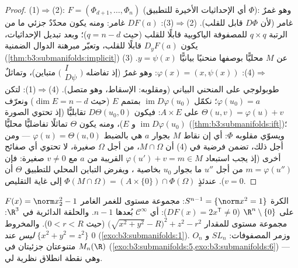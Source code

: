 \begin{proof}
(1)$\Rightarrow$(2): $F = (\Phi_{d+1}, \dots, \Phi_n)$ (أي الإحداثيات الأخيرة للتطبيق
$\Phi$): وهو غمرٌ غامر (لأن $D\Phi$ قابل للقلب).
(2)$\Rightarrow$(3): $DF(a)$ غامر: ومنه يكون محدّدٌ جزئي ما من
الرتبة $q \times q$ للمصفوفة الياكوبية قابلًا للقلب (حيث
$q = n - d$)؛ وبعد تبديل الإحداثيات، يكون $D_yF(a)$ قابلًا
للقلب، وتعبّر مبرهنة الدوال الضمنية (\cref{thm:b3:submanifolds:implicit}) عن $M$
محليًّا بوصفها منحنيًا بيانيًّا $y = \psi(x)$.
(3)$\Rightarrow$(4): $\varphi(x) = (x, \psi(x))$: وهو غمرٌ (إذ تفاضله $\bigl(\begin{smallmatrix}I\\
D\psi\end{smallmatrix}\bigr)$ متباين)،
وتماثلٌ طوبولوجي على المنحني البياني (ومقلوبه: الإسقاط، وهو
متصل).
(4)$\Rightarrow$(1): لتكن $\varphi(u_0) = a$؛ نكمّل $\operatorname{im}D\varphi(u_0)$ بمتمم $E$ (حيث
$\dim E = n - d$) ونعرّف $\Theta(u, v) = \varphi(u) + v$ على $A\times E$: فيكون $D\Theta(u_0, 0)$
تقابليًّا (إذ تحتوي الصورة $\operatorname{im}D\varphi(u_0)$ و $E$)، ومنه يكون $\Theta$
تماثلًا تفاضليًّا محليًّا (\cref{thm:b3:submanifolds:ift})؛ ويسوّي مقلوبه $\Phi$:
أي إن نقاط $M$ بجوار $a$ هي بالضبط $\varphi(u) = \Theta(u, 0)$ --- ومن أجل ذلك،
تضمن فرضية  في (4) أن $M\cap\Omega$، من أجل
$\Omega$ صغيرة، لا تحتوي أي صفائح أخرى (إذ يجب استبعاد $\varphi(u') + v = m \in
M$
القريبة من $a$ مع $v \neq 0$ صغيرة: فإن $m = \varphi(u'')$ من أجل $u''$ ما
بجوار $u_0$ بخاصية ، ويفرض التباين المحلي
للتطبيق $\Theta$ أن $v = 0$). عندئذٍ $\Phi(M\cap\Omega) = (A\times\{0\})
\cap\Phi(\Omega)$ إلى غاية التقليص.
\end{proof}

\begin{example}\label{ex:b3:submanifolds:examples}
الكرة $S^{n-1} = \{\norm x^2 = 1\}$: مجموعة مستوى للغمر الغامر $F(x) = \norm x_2^2 - 1$ على $\R^n\setminus\{0\}$
($DF(x) = 2x^{\mathsf T} \ne 0$): أي  $\mathcal C^\infty$ بُعدها $n - 1$. والحلقة
الدائرية في $\R^3$: مجموعة مستوى للمقدار $\bigl(\sqrt{x^2 + y^2} -
R\bigr)^2 + z^2 - r^2$ (حيث
$0 < r < R$). والمخروط $\{x^2 + y^2 =
z^2\}$ \emph{ليس}  عند $0$
(\cref{exo:b3:submanifolds:1}). وزمر المصفوفات: $SL_n$ و $O_n$ متنوعتان جزئيتان
في $M_n(\R)$ (\cref{exo:b3:submanifolds:5,exo:b3:submanifolds:6}) --- وهي نقطة انطلاق نظرية لي.
\end{example}

